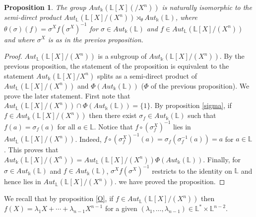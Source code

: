 \documentclass[12pt, reqno]{amsart}
\newtheorem{proposition}[theorem]{Proposition}
\newcommand{\K}{ {\Bbbk} }
\newcommand{\FL}{ {\mathbb L} }
\begin{document}
\begin{proposition}
The group $Aut_\K(\FL[X](/X^n))$ is naturally isomorphic to the semi-direct product $Aut_\FL(\FL[X]/(X^n) )\rtimes_\theta Aut_\K(\FL)$, where $\theta(\sigma)(f)=\sigma^Xf(\sigma^X)^{-1}$ for $\sigma  \in Aut_\K(\FL)$ and $f \in Aut_\FL(\FL[X]/(X^n))$ and where $\sigma^X$ is as in the previos proposition.
\end{proposition}
\begin{proof}
$Aut_\FL(\FL[X]/(X^n))$ is a subgroup of $Aut_\K(\FL[X]/(X^n))$. By the previous proposition, the statement of the proposition is equivalent to the statement $Aut_\K(\FL[X]/X^n)$ splits as a semi-direct product of $Aut_\FL(\FL[X]/(X^n))$ and $\Phi(Aut_\K(\FL))$ ($\Phi$ of the previous proposition). We prove the later statement. First note that $Aut_\FL(\FL[X]/(X^n))\cap  \Phi(Aut_\K(\FL))=\{1\}$. By proposition \ref{sigma}, if $f\in Aut_\K(\FL[X]/(X^n))$ then there exist $\sigma_f \in Aut_\K(\FL)$ such that $f(a)=\sigma_f(a)$ for all $a\in \FL$. Notice that $f\circ (\sigma_f^X)^{-1}$ lies in $Aut_\FL(\FL[X]/(X^n))$. Indeed, $f\circ (\sigma_f^X)^{-1}(a)=\sigma_f(\sigma_f^{-1}(a))=a$ for $a\in \FL$. This proves that $Aut_\K(\FL[X]/(X^n))=Aut_\FL(\FL[X]/(X^n))\Phi (Aut_\K(\FL))$. Finally, for $\sigma  \in Aut_\K(\FL)$ and $f \in Aut_\K(\FL)$, $\sigma^Xf(\sigma^X)^{-1}$ restricts to the identity on $\FL$ and hence lies in $Aut_\FL(\FL[X]/(X^n))$. we have proved the proposition.
\end{proof}
We recall that by proposition \ref{O}, if $f\in Aut_\FL(\FL[X]/(X^n))$ then $f(X)= \lambda_1 X + \cdots + \lambda_{n-1} X^{n-1}$ for a given $(\lambda_1,\dots,\lambda_{n-1}) \in \FL^*\times \FL^{n-2}$.
\end{document}
